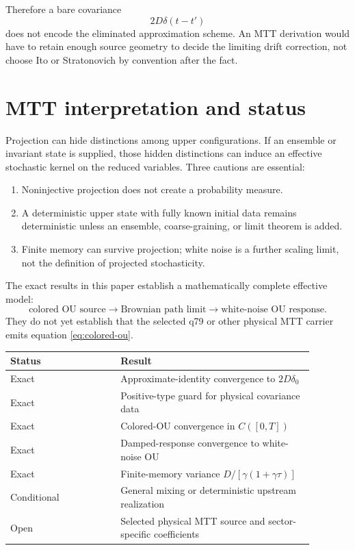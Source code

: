 \documentclass[11pt]{article}
\begin{document}
Therefore a bare covariance
\[
2D\delta(t-t')
\]
does not encode the eliminated approximation scheme. An MTT derivation would
have to retain enough source geometry to decide the limiting drift correction,
not choose Ito or Stratonovich by convention after the fact.

\section{MTT interpretation and status}

Projection can hide distinctions among upper configurations. If an ensemble
or invariant state is supplied, those hidden distinctions can induce an
effective stochastic kernel on the reduced variables. Three cautions are
essential:
\begin{enumerate}
\item Noninjective projection does not create a probability measure.
\item A deterministic upper state with fully known initial data remains
deterministic unless an ensemble, coarse-graining, or limit theorem is added.
\item Finite memory can survive projection; white noise is a further scaling
limit, not the definition of projected stochasticity.
\end{enumerate}

The exact results in this paper establish a mathematically complete effective
model:
\[
\text{colored OU source}
\longrightarrow
\text{Brownian path limit}
\longrightarrow
\text{white-noise OU response}.
\]
They do not yet establish that the selected q79 or other physical MTT carrier
emits equation \eqref{eq:colored-ou}.

\begin{center}
\begin{tabular}{p{0.32\linewidth}p{0.56\linewidth}}
\toprule
Status & Result\\
\midrule
Exact & Approximate-identity convergence to \(2D\delta_0\)\\
Exact & Positive-type guard for physical covariance data\\
Exact & Colored-OU convergence in \(C([0,T])\)\\
Exact & Damped-response convergence to white-noise OU\\
Exact & Finite-memory variance
\(D/[\gamma(1+\gamma\tau)]\)\\
Conditional & General mixing or deterministic upstream realization\\
Open & Selected physical MTT source and sector-specific coefficients\\
\bottomrule
\end{tabular}
\end{center}
\end{document}
